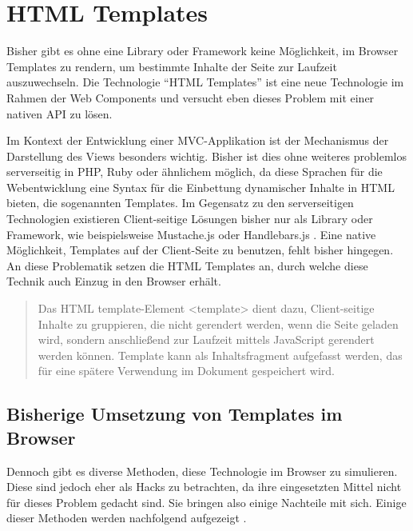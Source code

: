 \section{HTML Templates}\label{html-templates}

Bisher gibt es ohne eine Library oder Framework keine Möglichkeit, im Browser Templates zu rendern, um bestimmte Inhalte der Seite zur Laufzeit auszuwechseln. Die Technologie ``\ac{HTML} Templates'' ist eine neue Technologie im Rahmen der Web Components und versucht eben dieses Problem mit einer nativen \ac{API} zu lösen.

Im Kontext der Entwicklung einer \ac{MVC}-Applikation ist der Mechanismus der Darstellung des Views besonders wichtig. Bisher ist dies ohne weiteres problemlos serverseitig in PHP, Ruby oder ähnlichem möglich, da diese Sprachen für die Webentwicklung eine Syntax für die Einbettung dynamischer Inhalte in \ac{HTML} bieten, die sogenannten Templates. Im Gegensatz zu den serverseitigen Technologien existieren Client-seitige Lösungen bisher nur als Library oder Framework, wie beispielsweise Mustache.js oder Handlebars.js \cite{citeulike:13853015}. Eine native Möglichkeit, Templates auf der Client-Seite zu benutzen, fehlt bisher hingegen. An diese Problematik setzen die \ac{HTML} Templates an, durch welche diese Technik auch Einzug in den Browser erhält. \cite[S. 101--107]{citeulike:13844975}

\begin{quote}
Das \ac{HTML} template-Element \textless{}template\textgreater{} dient dazu, Client-seitige Inhalte zu gruppieren, die nicht gerendert werden, wenn die Seite geladen wird, sondern anschließend zur Laufzeit mittels JavaScript gerendert werden können. Template kann als Inhaltsfragment aufgefasst werden, das für eine spätere Verwendung im Dokument gespeichert wird. \cite{citeulike:13852997}
\end{quote}


\subsection{Bisherige Umsetzung von Templates im Browser}\label{bisherige-umsetzung-von-templates-im-browser}

Dennoch gibt es diverse Methoden, diese Technologie im Browser zu simulieren. Diese sind jedoch eher als Hacks zu betrachten, da ihre eingesetzten Mittel nicht für dieses Problem gedacht sind. Sie bringen also einige Nachteile mit sich. Einige dieser Methoden werden nachfolgend aufgezeigt \cite{citeulike:13853018}.


